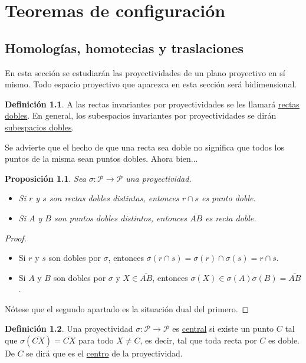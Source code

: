 \documentclass[12pt]{report}
\newtheorem{proposition}{Proposición}[chapter]
\theoremstyle{definition}
\newtheorem{definition}{Definición}[chapter]
\theoremstyle{definition}
\theoremstyle{remark}
\begin{document}
\chapter{Teoremas de configuración}

\section{Homologías, homotecias y traslaciones}

En esta sección se estudiarán las proyectividades de un plano proyectivo en sí mismo. Todo espacio proyectivo que aparezca en esta sección será bidimensional.

\begin{definition}
A las rectas invariantes por proyectividades se les llamará \ul{rectas dobles}. En general, los subespacios invariantes por proyectividades se dirán \ul{subespacios dobles}.
\end{definition}

Se advierte que el hecho de que una recta sea doble no significa que todos los puntos de la misma sean puntos dobles. Ahora bien...

\begin{proposition}
\label{prop3.1.}
Sea $\sigma \colon \mathcal{P} \to \mathcal{P}$ una proyectividad.
\begin{itemize}
    \item[(i)] Si $r$ y $s$ son rectas dobles distintas, entonces $r \cap s$ es punto doble.
    \item[(ii)] Si $A$ y $B$ son puntos dobles distintos, entonces $\overline{AB}$ es recta doble.
\end{itemize}
\end{proposition}

\begin{proof}
\hfill
\begin{itemize}
    \item[(i)] Si $r$ y $s$ son dobles por $\sigma$, entonces $\sigma(r \cap s) = \sigma(r) \cap \sigma(s) = r \cap s$.
    \item[(ii)] Si $A$  y $B$ son dobles por $\sigma$ y $X \in \overline{AB}$, entonces $\sigma(X) \in \overline{\sigma(A)\sigma(B)} = \overline{AB}$.
\end{itemize}
Nótese que el segundo apartado es la situación dual del primero.
\end{proof}

\begin{definition}
Una proyectividad $\sigma \colon \mathcal{P} \to \mathcal{P}$ es \ul{central} si existe un punto $C$ tal que $\sigma(\overline{CX}) = \overline{CX}$ para todo $X \neq C$, es decir, tal que toda recta por $C$ es doble. De $C$ se dirá que es el \ul{centro} de la proyectividad.
\end{definition}
\end{document}
